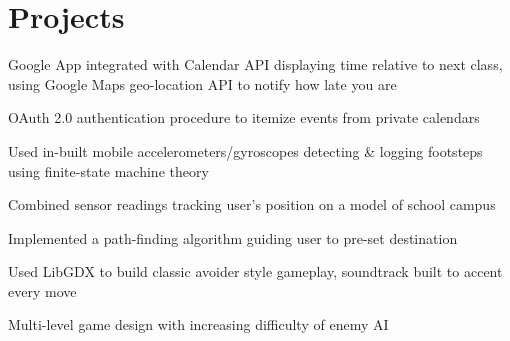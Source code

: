 \documentclass[letterpaper]{deedy-resume}
\begin{document}
\begin{minipage}[t]{0.66\textwidth}

\section{Projects}



\begin{tightitemize}
\item Google App integrated with Calendar API displaying time relative to next class, using Google Maps geo-location API to notify how late you are 
\item OAuth 2.0 authentication procedure to itemize events from private calendars
\end{tightitemize}

\sectionspace %



\begin{tightitemize}
\item Used in-built mobile accelerometers/gyroscopes detecting \& logging footsteps using finite-state machine theory
\item Combined sensor readings tracking user’s position on a model of school campus 
\item Implemented a path-finding algorithm guiding user to pre-set destination 
\end{tightitemize}

\sectionspace %



\begin{tightitemize}
\item Used LibGDX to build classic avoider style gameplay, soundtrack built to accent every move
\item Multi-level game design with increasing difficulty of enemy AI
\end{tightitemize}


\end{minipage}
\end{document}
